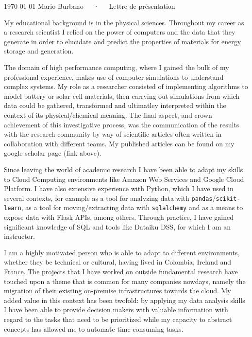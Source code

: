 \documentclass[11pt, a4paper]{awesome-cv}
\begin{document}
\makecvheader[R]

\makecvfooter
  {\today}
  {Mario Burbano~~~·~~~Lettre de présentation}
  {}

\makelettertitle

\begin{cvletter}


My educational background is in the physical sciences. Throughout my career as a research scientist I relied on the power of computers and the data that they generate in order to elucidate and predict the properties of materials for energy storage and generation.

The domain of high performance computing, where I gained the bulk of my professional experience, makes use of computer simulations to understand complex systems. My role as a researcher consisted of implementing algorithms to model battery or solar cell materials, then carrying out simulations from which data could be gathered, transformed and ultimatley interpreted within the context of its physical/chemical meaning. The final aspect, and crown achievement of this investigative process, was the communication of the results with the research community by way of scientific articles often written in collaboration with different teams. My published articles can be found on my google scholar page (link above).

Since leaving the world of academic research I have been able to adapt my skills to Cloud Computing environments like Amazon Web Services and Google Cloud Platform. I have also extensive experience with Python, which I have used in several contexts, for example as a tool for analyzing data with \texttt{pandas}/\texttt{scikit-learn}, as a tool for moving/extracting data with \texttt{sqlalchemy} and as a means to expose data with Flask APIs, among others. Through practice, I have gained significant knowledge of SQL and tools like Dataiku DSS, for which I am an instructor.

I am a highly motivated person who is able to adapt to different environments, whether they be technical or cultural, having lived in Colombia, Ireland and France. The projects that I have worked on outside fundamental research have touched upon a theme that is common for many companies nowdays, namely the migration of their existing on-premise infrastructures towards the cloud. My added value in this context has been twofold: by applying my data analysis skills I have been able to provide decision makers with valuable information with regard to the tasks that need to be prioritized while my capacity to abstract concepts has allowed me to automate time-consuming tasks.


\end{cvletter}
\end{document}
